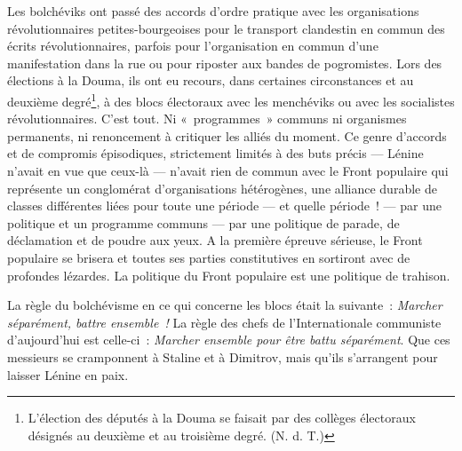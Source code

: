 \documentclass[french,twoside]{book} %
\begin{document}
Les bolchéviks ont passé des accords d’ordre pratique avec les organisations révolutionnaires petites-bourgeoises pour le transport clandestin en commun des écrits révolutionnaires, parfois pour l’organisation en commun d’une manifestation dans la rue ou pour riposter aux bandes de pogromistes. Lors des élections à la Douma, ils ont eu recours, dans certaines circonstances et au deuxième degré\footnote{ \noindent L’élection des députés à la Douma se faisait par des collèges électoraux désignés au deuxième et au troisième degré. (N. d. T.)
 }, à des blocs électoraux avec les menchéviks ou avec les socialistes révolutionnaires. C’est tout. Ni « programmes » communs ni organismes permanents, ni renoncement à critiquer les alliés du moment. Ce genre d’accords et de compromis épisodiques, strictement limités à des buts précis — Lénine n’avait en vue que ceux-là — n’avait rien de commun avec le Front populaire qui représente un conglomérat d’organisations hétérogènes, une alliance durable de classes différentes liées pour toute une période — et quelle période ! — par une politique et un programme communs — par une politique de parade, de déclamation et de poudre aux yeux. A la première épreuve sérieuse, le Front populaire se brisera et toutes ses parties constitutives en sortiront avec de  profondes lézardes. La politique du Front populaire est une politique de trahison.\par
La règle du bolchévisme en ce qui concerne les blocs était la suivante : \emph{Marcher séparément, battre ensemble !} La règle des chefs de l’Internationale communiste d’aujourd’hui est celle-ci : \emph{Marcher ensemble pour être battu séparément}. Que ces messieurs se cramponnent à Staline et à Dimitrov, mais qu’ils s’arrangent pour laisser Lénine en paix.\par
\end{document}
